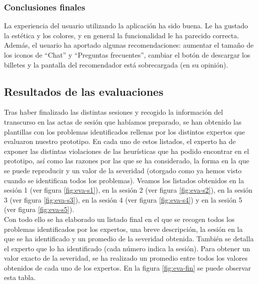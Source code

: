 \subsubsection{Conclusiones finales}
La experiencia del usuario utilizando la aplicación ha sido buena. Le ha gustado la estética y los colores, y en general la funcionalidad le ha parecido correcta. Además, el usuario ha aportado algunas recomendaciones:
aumentar el tamaño de los iconos de “Chat” y “Preguntas frecuentes”, cambiar el botón de descargar los billetes y la pantalla del recomendador está sobrecargada (en su opinión).

\subsection{Resultados de las evaluaciones}
Tras haber finalizado las distintas sesiones y recogido la información del transcurso en las actas de sesión que habíamos preparado, se han obtenido las plantillas con los problemas identificados rellenas
por los distintos expertos que evaluaron nuestro prototipo. En cada uno de estos listados, el experto ha de exponer las distintas violaciones de las heurísticas que ha podido encontrar en el prototipo, así como
las razones por las que se ha considerado, la forma en la que se puede reproducir y un valor de la severidad (otorgado como ya hemos visto cuando se identifican todos los problemas).
Veamos los listados obtenidos en la sesión 1 (ver figura \ref{fig:eva-s1}), en la sesión 2 (ver figura \ref{fig:eva-s2}),
en la sesión 3 (ver figura \ref{fig:eva-s3}), en la sesión 4 (ver figura \ref{fig:eva-s4}) y en la sesión 5 (ver figura \ref{fig:eva-s5}). \\

Con todo ello se ha elaborado un listado final en el que se recogen todos los problemas identificados por los expertos, una breve
descripción, la sesión en la que se ha identificado y un promedio de la severidad obtenida. También se detalla el experto que lo ha identificado (cada número indica la sesión).
Para obtener un valor exacto de la severidad, se ha realizado un promedio entre todos los valores obtenidos de cada uno de los expertos. En la figura \ref{fig:eva-fin} se puede observar esta tabla. \\

